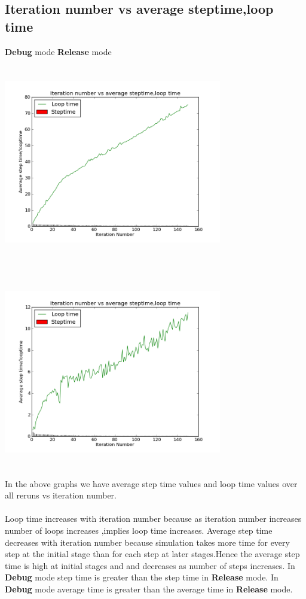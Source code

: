 \documentclass{article}
\begin{document}
\subsection{Iteration number vs average steptime,loop time}
\textbf{Debug} mode \hfill \textbf{Release} mode\\
\includegraphics[width=270pt,height=260pt]{g27_lab09_plot01_debug} \hfill  
\includegraphics[width=270pt,height=260pt]{g27_lab09_plot01_release}\\
In the above graphs we have average step time values and loop time values over 
all reruns vs iteration number.\\\\
Loop time increases with iteration number because as iteration number increases number of loops increases
,implies loop  time increases.
Average step time decreases with iteration number because simulation takes more time for every step at the 
initial stage than for each step at later stages.Hence the average step time is high at initial stages and 
and decreases as number of steps increases.
In \textbf{Debug} mode step time is greater than the step time in \textbf{Release} mode.
In \textbf{Debug} mode average time is greater than the average time in \textbf{Release} mode.
\end{document}
